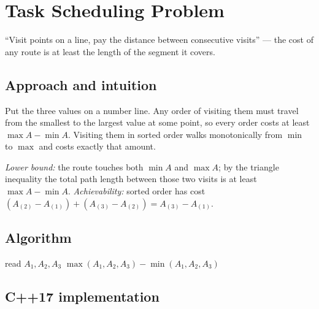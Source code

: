 \section{Task Scheduling Problem}
\label{sec:g-task-scheduling}


\begin{patternbox}
``Visit points on a line, pay the distance between consecutive visits'' ---
the cost of any route is at least the length of the segment it covers.
\end{patternbox}

\subsection*{Approach and intuition}

Put the three values on a number line. Any order of visiting them must
travel from the smallest to the largest value at some point, so every order
costs at least $\max A-\min A$. Visiting them in sorted order walks
monotonically from $\min$ to $\max$ and costs exactly that amount.

\begin{ideabox}
\emph{Lower bound:} the route touches both $\min A$ and $\max A$; by the
triangle inequality the total path length between those two visits is at
least $\max A-\min A$. \emph{Achievability:} sorted order has cost
$(A_{(2)}-A_{(1)})+(A_{(3)}-A_{(2)})=A_{(3)}-A_{(1)}$.
\end{ideabox}

\subsection*{Algorithm}
\begin{algorithmic}[1]
\State read $A_1,A_2,A_3$
\State \Return $\max(A_1,A_2,A_3)-\min(A_1,A_2,A_3)$
\end{algorithmic}


\subsection*{C++17 implementation}

